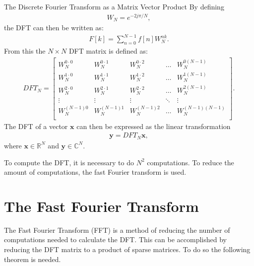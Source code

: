 \begin{theorem}{The Discrete Fourier Transform as a Matrix Vector Product}
    By defining
    \begin{align*}
        W_N=e^{-2j\pi/N},
    \end{align*}
    the DFT can then be written as:
    \begin{align*}
        F[k]=\sum^{N-1}_{n=0}f[n]W_N^{nk}.
    \end{align*}
    From this the $N\times N$ DFT matrix is defined as:
    \begin{align*}
        DFT_N=
        \begin{bmatrix}
             W_N^{0\cdot0} & W_N^{0\cdot1} & W_N^{0\cdot2} & \hdots & W_N^{0(N-1)} \\
             W_N^{1\cdot0} & W_N^{1\cdot1} & W_N^{1\cdot2} & \hdots & W_N^{1(N-1)} \\
             W_N^{2\cdot 0} & W_N^{2\cdot1} & W_N^{2\cdot2} & \hdots & W_N^{2(N-1)} \\
             \vdots & \vdots & \vdots & \ddots & \vdots \\
             W_N^{(N-1)0} & W_N^{(N-1)1} & W_N^{(N-1)2} & \hdots & W_N^{(N-1)(N-1)} \\
         \end{bmatrix}.
    \end{align*}
    The DFT of a vector $\textbf{x}$ can then be expressed as the linear transformation
    \begin{align*}
        \textbf{y}=DFT_N\textbf{x},
    \end{align*}
    where $\textbf{x} \in \mathds{R}^{N}$ and $\textbf{y} \in \mathds{C}^{N}$. \cite[10]{rao2011fast}
\end{theorem}

\noindent To compute the DFT, it is necessary to do $N^2$ computations. To reduce the amount of computations, the fast Fourier transform is used.

\section{The Fast Fourier Transform}
The Fast Fourier Transform (FFT) is a method of reducing the number of computations needed to calculate the DFT. This can be accomplished by reducing the DFT matrix to a product of sparse matrices. 
To do so the following theorem is needed.

